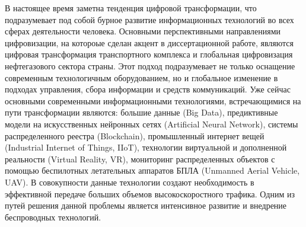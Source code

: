 {\actuality} 

В настоящее время заметна тенденция цифровой трансформации, что подразумевает под собой бурное развитие информационных технологий во всех сферах деятельности человека. Основными перспективными направлениями цифровизации, на котороые сделан акцент в диссертационной работе, являются цифровая трансформация транспортного комплекса и глобальная цифровизация нефтегазового сектора страны. Этот подход подразумевает не только оснащение современным технологичным оборудованием, но и глобальное изменение в подходах управления, сбора информации и средств коммуникаций. Уже сейчас основными современными информационными технологиями, встречающимися на пути трансформации являются: большие данные (Big Data), предиктивные модели на искусственных нейронных сетях (Artificial Neural Network), системы распределенного реестра (Blockchain), промышленный интернет вещей (Industrial Internet of Things, IIoT), технологии виртуальной и дополненной реальности (Virtual Reality, VR), мониторинг распределенных объектов с помощью беспилотных летательных аппаратов БПЛА (Unmanned Aerial Vehicle, UAV). В совокупности данные технологии создают необходимость в эффективной передаче больших объемов высокоскоростного трафика. Одним из путей решения данной проблемы является интенсивное развитие и внедрение беспроводных технологий.


 
